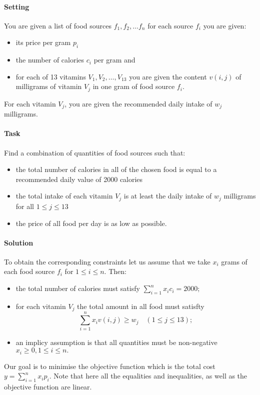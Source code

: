 \paragraph{Setting}
You are given a list of food sources \(f_1,f_2,\dots f_n\) for each source \(f_i\) you are given:
\begin{itemize}
    \item its price per gram \(p_i\)
    \item the number of calories \(c_i\) per gram and
    \item for each of 13 vitamins \(V_1, V_2, \dots, V_{13}\) you are given the content \(v(i,j)\) of milligrams of vitamin \(V_j\) in one gram of food source \(f_i\).
\end{itemize}
For each vitamin \(V_j\), you are given the recommended daily intake of \(w_j\) milligrams.

\paragraph{Task} 
Find a combination of quantities of food sources such that:
\begin{itemize}
    \item the total number of calories in all of the chosen food is equal to a recommended daily value of 2000 calories
    \item the total intake of each vitamin \(V_j\) is at least the daily intake of \(w_j\) milligrams for all \(1 \leq j \leq 13\)
    \item the price of all food per day is as low as possible.
\end{itemize}

\paragraph{Solution}
To obtain the corresponding constraints let us assume that we take \(x_i\) grams of each food source \(f_i\) for \(1 \leq i \leq n\). Then:
\begin{itemize}
    \item the total number of calories must satisfy \(\sum_{i=1}^n x_ic_i = 2000;\)
    \item for each vitamin \(V_j\) the total amount in all food must satisfty
    \[\sum_{i=1}^n x_iv(i,j) \geq w_j \quad (1\leq j \leq 13);\]
    \item an implicy assumption is that all quantities must be non-negative \(x_i \geq 0, 1 \leq i \leq n.\)
\end{itemize}
Our goal is to minimise the objective function which is the total cost \(y = \sum_{i=1}^n x_ip_i\). Note that here all the equalities and inequalities, as well as the objective function are linear. 

